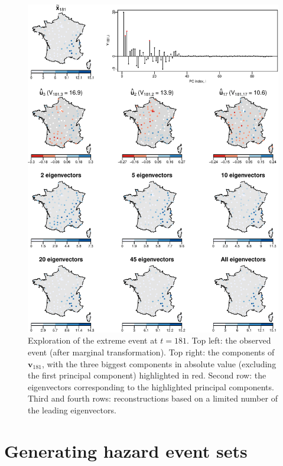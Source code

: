 \documentclass[en-GB, a4paper, nobind]{templates/bathreport}
\begin{document}
\begin{figure}

{\centering \includegraphics[width=1\linewidth]{figures/fr-event-181-1} 

}

\caption[Exploration of the extreme event at $t=181$.]{Exploration of the extreme event at $t=181$. Top left: the observed event (after marginal transformation). Top right: the components of $\bm{v}_{181}$, with the three biggest components in absolute value (excluding the first principal component) highlighted in red. Second row: the eigenvectors corresponding to the highlighted principal components. Third and fourth rows: reconstructions based on a limited number of the leading eigenvectors.}\label{fig:fr-event-181}
\end{figure}

\hypertarget{fr-generate-events}{%
\section{Generating hazard event sets}\label{fr-generate-events}}
\end{document}
